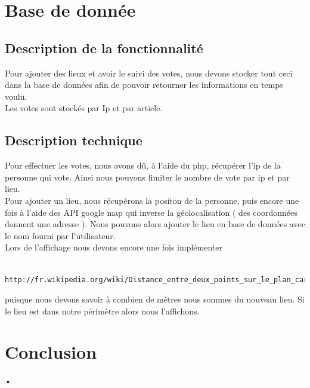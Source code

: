 \documentclass[10pt,a4paper]{report}
\begin{document}

\section{Base de donnée}

\subsection{Description de la fonctionnalité}
\begin{flushleft}
Pour ajouter des lieux et avoir le suivi des votes, nous devons stocker tout ceci dans la base de données afin de pouvoir retourner les informations en temps voulu. \\

Les votes sont stockés par Ip et par article. \\
\end{flushleft}

\subsection{Description technique}
\begin{flushleft}
Pour effectuer les votes, nous avons dû, à l'aide du php, récupérer l'ip de la personne qui vote. Ainsi nous pouvons limiter le nombre de vote par ip et par lieu. \\

Pour ajouter un lieu, nous récupérons la positon de la personne, puis encore une fois à l'aide des API google map qui inverse la géolocalisation ( des coordonnées donnent une adresse ). Nous pouvons alors ajouter le lieu en base de données avec le nom fourni par l'utilisateur. \\

Lors de l'affichage nous devons encore une fois implémenter 
\begin{verbatim}
	http://fr.wikipedia.org/wiki/Distance_entre_deux_points_sur_le_plan_cart%C3%A9sien
\end{verbatim} 
puisque nous devons savoir à combien de mètres nous sommes du nouveau lieu.
Si le lieu est dans notre périmètre alors nous l'affichons.\\
\end{flushleft}



\section{Conclusion}
\begin{flushleft}
•
\end{flushleft}
\end{document}
